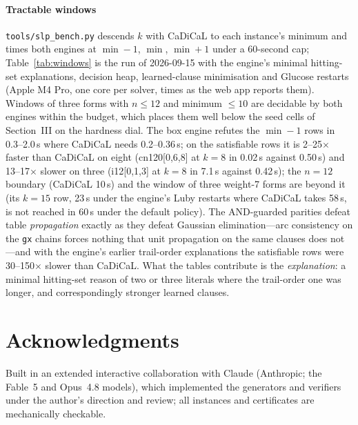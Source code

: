 \documentclass[conference]{IEEEtran}
\begin{document}
\paragraph{Tractable windows}
\texttt{tools/slp\_bench.py} descends $k$ with CaDiCaL to each instance's
minimum and times both engines at $\min-1$, $\min$, $\min+1$ under a
60-second cap; Table~\ref{tab:windows} is the run of 2026-09-15 with
the engine's minimal hitting-set explanations, decision heap,
learned-clause minimisation and Glucose restarts (Apple M4 Pro, one core
per solver, times as the web app reports them). Windows
of three forms with $n \le 12$ and minimum $\le 10$ are decidable by both
engines within the budget, which places them well below the seed cells
of Section~III on the hardness dial. The box engine refutes the
$\min-1$ rows in 0.3--2.0\,s where CaDiCaL needs 0.2--0.36\,s; on the
satisfiable rows it is 2--25$\times$ faster than CaDiCaL on eight
(cn120[0,6,8] at $k=8$ in 0.02\,s against 0.50\,s) and 13--17$\times$
slower on three (i12[0,1,3] at $k=8$ in 7.1\,s against 0.42\,s); the
$n=12$ boundary (CaDiCaL 10\,s) and the window of three weight-7 forms
are beyond it (its $k=15$ row, 23\,s under the engine's Luby restarts
where CaDiCaL takes 58\,s, is not reached in 60\,s under the default
policy). The AND-guarded parities
defeat table \emph{propagation} exactly as they defeat Gaussian
elimination---arc consistency on the \texttt{gx} chains forces nothing
that unit propagation on the same clauses does not---and with the
engine's earlier trail-order explanations the satisfiable rows were
30--150$\times$ slower than CaDiCaL. What the tables contribute is the
\emph{explanation}: a minimal hitting-set reason of two or three literals
where the trail-order one was longer, and correspondingly stronger
learned clauses.


\section*{Acknowledgments}

Built in an extended interactive collaboration with Claude
(Anthropic; the Fable~5 and Opus~4.8 models), which implemented the
generators and verifiers under the author's direction and review;
all instances and certificates are mechanically checkable.
\end{document}
